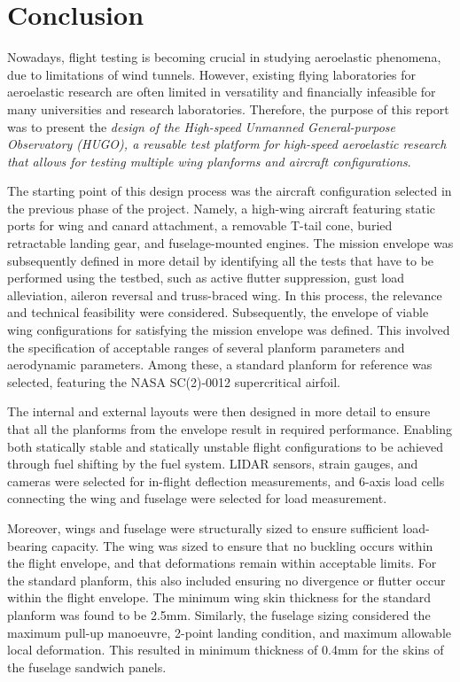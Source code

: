 \chapter{Conclusion}
\label{ch:conclusion}

Nowadays, flight testing is becoming crucial in studying aeroelastic phenomena, due to limitations of wind tunnels. However, existing flying laboratories for aeroelastic research are often limited in versatility and financially infeasible for many universities and research laboratories. Therefore, the purpose of this report was to present the \textit{design of the High-speed Unmanned General-purpose Observatory (HUGO), a reusable test platform for high-speed aeroelastic research that allows for testing multiple wing planforms and aircraft configurations}.

The starting point of this design process was the aircraft configuration selected in the previous phase of the project. Namely, a high-wing aircraft featuring static ports for wing and canard attachment, a removable T-tail cone, buried retractable landing gear, and fuselage-mounted engines. The mission envelope was subsequently defined in more detail by identifying all the tests that have to be performed using the testbed, such as active flutter suppression, gust load alleviation, aileron reversal and truss-braced wing. In this process, the relevance and technical feasibility were considered. Subsequently, the envelope of viable wing configurations for satisfying the mission envelope was defined. This involved the specification of acceptable ranges of several planform parameters and aerodynamic parameters. Among these, a standard planform for reference was selected, featuring the NASA SC(2)-0012 supercritical airfoil.

The internal and external layouts were then designed in more detail to ensure that all the planforms from the envelope result in required performance. Enabling both statically stable and statically unstable flight configurations to be achieved through fuel shifting by the fuel system. LIDAR sensors, strain gauges, and cameras were selected for in-flight deflection measurements, and 6-axis load cells connecting the wing and fuselage were selected for load measurement. 

Moreover, wings and fuselage were structurally sized to ensure sufficient load-bearing capacity. The wing was sized to ensure that no buckling occurs within the flight envelope, and that deformations remain within acceptable limits. For the standard planform, this also included ensuring no divergence or flutter occur within the flight envelope. The minimum wing skin thickness for the standard planform was found to be 2.5mm. Similarly, the fuselage sizing considered the maximum pull-up manoeuvre, 2-point landing condition, and maximum allowable local deformation. This resulted in minimum thickness of 0.4mm for the skins of the fuselage sandwich panels.

